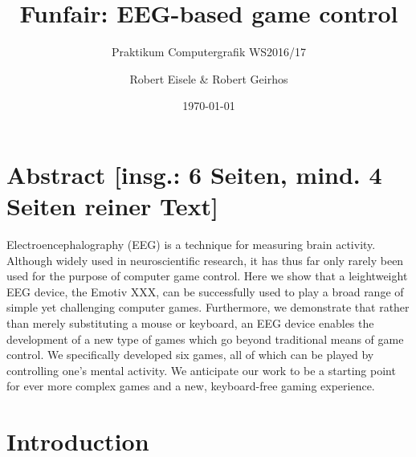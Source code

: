 \documentclass{utue} %
\title{Funfair: EEG-based game control}
\author{Robert Eisele \& Robert Geirhos}
\date{\today}
\subtitle{Praktikum Computergrafik WS2016/17}
\begin{document}

\maketitle

\section*{Abstract [insg.: 6 Seiten, mind. 4 Seiten reiner Text]}

Electroencephalography (EEG) is a technique for measuring brain activity. Although widely used in neuroscientific research, it has thus far only rarely been used for the purpose of computer game control. Here we show that a leightweight EEG device, the Emotiv XXX, can be successfully used to play a broad range of simple yet challenging computer games. Furthermore, we demonstrate that rather than merely substituting a mouse or keyboard, an EEG device enables the development of a new type of games which go beyond traditional means of game control. We specifically developed six games, all of which can be played by controlling one's mental activity. We anticipate our work to be a starting point for ever more complex games and a new, keyboard-free gaming experience.




\section{Introduction}
\end{document}
